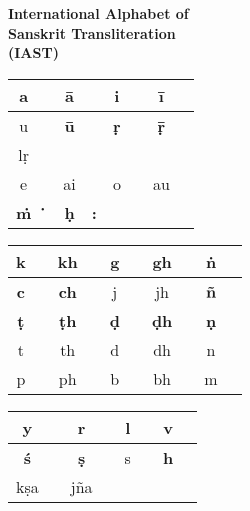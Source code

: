 \thispagestyle{empty}
\begin{center}
{\LARGE\bfseries International Alphabet of\\[3pt] Sanskrit Transliteration\\[8pt] (IAST)}
\vskip 30pt

\bgroup
\fontsize{11}{14pt}\selectfont
\renewcommand{\arraystretch}{1.5}
\begin{tabular}{|c|c!{\vrule width 0.8pt}c|c!{\vrule width 0.8pt}c|c!{\vrule width 0.8pt}c|c|}
\hline
a &  & {\bf ā} &  & i &  & {\bf ī} & \\
\hline
u &      & {\bf ū} &  & {\bf ṛ} &  & {\bf ṝ} &  \\
\hline
lṛ &    &     &                       &     &                       &      & \\
\hline
e &  & ai &  & o &  & au & \\
\hline
{\bf ṁ} &  {\bf‍\.{\phantom{i}}}  & {\bf ḥ}  & {\bf :}         &   &            &   & \\  	
\hline
\end{tabular}
\vskip 20pt

\begin{tabular}{|c|c!{\vrule width 0.8pt}c|c!{\vrule width 0.8pt}c|c!{\vrule width 0.8pt}c|c!{\vrule width 0.8pt}c|c|}
\hline
k &  & kh &  & g &  & gh &  & {\bf ṅ} & \\
\hline
{\bf c} &  & {\bf ch} &  & j &  & jh &   & {\bf ñ} &  \\
\hline
{\bf ṭ} &  & {\bf ṭh} &  & {\bf ḍ} &   & {\bf ḍh} &  & {\bf ṇ} &   \\
\hline
t &   & th &   & d &  & dh &   & n &  \\
\hline
p &  & ph &  & b &  & bh &   & m &  \\ 
\hline
\end{tabular}
\vskip 20pt

\begin{tabular}{|c|c!{\vrule width 0.8pt}c|c!{\vrule width 0.8pt}c|c!{\vrule width 0.8pt}c|c|}
\hline
y &      & r   &  & l &  & v &  \\
\hline
{\bf ś} &    & {\bf ṣ}   &  & s &  & {\bf h} &  \\
\hline
kṣa &  & jña &  &    &    &   &  \\
\hline
\end{tabular}
\egroup
\end{center}
